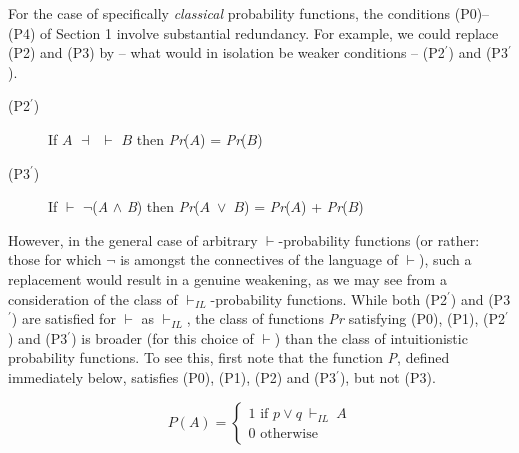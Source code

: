 \documentclass[
  11pt,
  letterpaper,
  DIV=11,
  numbers=noendperiod,
  oneside]{scrartcl}
\begin{document}
For the case of specifically \emph{classical} probability functions, the
conditions (P0)--(P4) of Section 1 involve substantial redundancy. For
example, we could replace (P2) and (P3) by -- what would in isolation be
weaker conditions -- (P2\(^\prime\)) and (P3\(^\prime\)).

\begin{description}
\item[(P2\(^\prime\))]
If \(A\) \(\dashv\)~\(\vdash\) \(B\) then \emph{Pr}(\(A\)) =
\emph{Pr}(\(B\))
\item[(P3\(^\prime\))]
If \(\vdash\) \({\lnot}\)(\emph{A} \({\wedge}\) \emph{B}) then
\emph{Pr}(\(A\)~\({\vee}\)~\(B\)) = \emph{Pr}(\(A\)) + \emph{Pr}(\(B\))
\end{description}

However, in the general case of arbitrary \(\vdash\)-probability
functions (or rather: those for which \({\lnot}\) is amongst the
connectives of the language of \(\vdash\)), such a replacement would
result in a genuine weakening, as we may see from a consideration of the
class of \(\vdash_{IL}\)-probability functions. While both
(P2\(^\prime\)) and (P3\(^\prime\)) are satisfied for \(\vdash\) as
\(\vdash_{IL}\), the class of functions \emph{Pr} satisfying (P0), (P1),
(P2\(^\prime\)) and (P3\(^\prime\)) is broader (for this choice of
\(\vdash\)) than the class of intuitionistic probability functions. To
see this, first note that the function \emph{P}, defined immediately
below, satisfies (P0), (P1), (P2) and (P3\(^\prime\)), but not (P3).

\[P(A) = 
\begin{cases}
1 \text{ if } p \vee q~ \vdash_{IL}~ A \\
0 \text{ otherwise}
\end{cases}
\]
\end{document}
